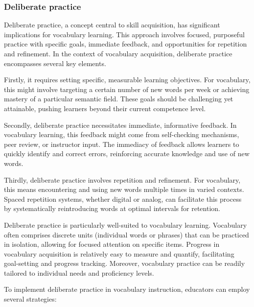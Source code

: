 \subsubsection{Deliberate practice}\label{sec:delib}

Deliberate practice, a concept central to skill acquisition, has significant implications for vocabulary learning. This approach involves focused, purposeful practice with specific goals, immediate feedback, and opportunities for repetition and refinement. In the context of vocabulary acquisition, deliberate practice encompasses several key elements.

Firstly, it requires setting specific, measurable learning objectives. For vocabulary, this might involve targeting a certain number of new words per week or achieving mastery of a particular semantic field. These goals should be challenging yet attainable, pushing learners beyond their current competence level.

Secondly, deliberate practice necessitates immediate, informative feedback. In vocabulary learning, this feedback might come from self-checking mechanisms, peer review, or instructor input. The immediacy of feedback allows learners to quickly identify and correct errors, reinforcing accurate knowledge and use of new words.

Thirdly, deliberate practice involves repetition and refinement. For vocabulary, this means encountering and using new words multiple times in varied contexts. Spaced repetition systems, whether digital or analog, can facilitate this process by systematically reintroducing words at optimal intervals for retention.

Deliberate practice is particularly well-suited to vocabulary learning. Vocabulary often comprises discrete units (individual words or phrases) that can be practiced in isolation, allowing for focused attention on specific items. Progress in vocabulary acquisition is relatively easy to measure and quantify, facilitating goal-setting and progress tracking. Moreover, vocabulary practice can be readily tailored to individual needs and proficiency levels.

To implement deliberate practice in vocabulary instruction, educators can employ several strategies:

